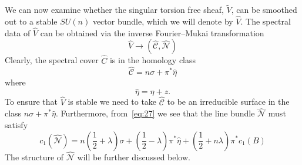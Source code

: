 \documentclass[a4paper,12pt]{article}
\numberwithin{equation}{section}
\def\cC{{\mathcal C}}
\def\cN{{\mathcal N}}
\theoremstyle{plain}
\begin{document}
We can now examine whether the singular torsion free sheaf, $\widetilde{V}$, 
can be smoothed out to a stable $SU(n)$ vector bundle, 
which we will denote by $\widehat{V}$. The spectral data of  
$\widehat{V}$ can be
obtained via the inverse Fourier--Mukai transformation
\begin{equation}
\widehat{V} \longrightarrow (\widehat{\cC}, \widehat{\cN})
\label{eq:76}
\end{equation}
Clearly, the spectral cover $\widehat{C}$ is in the homology class
\begin{equation}
\widehat{\cC} = n\sigma +\pi^{*}\hat{\eta}
\label{eq:77}
\end{equation}
where
\begin{equation}
\hat{\eta}=\eta +z.
\label{eq:78}
\end{equation}
To ensure that $\widehat{V}$ is stable we need to take $\widehat{\cC}$
to be an irreducible surface in the class $n\sigma +
\pi^{*}\hat{\eta}$. 
Furthermore, from~\eqref{eq:27} we see that the line bundle
$\widehat{\cN}$ must satisfy 
\begin{equation}
c_{1}(\widehat{\cN})=n(\frac{1}{2}+\lambda)\sigma+(\frac{1}{2}-\lambda)
\pi^{*}\hat{\eta}+(\frac{1}{2}+n\lambda)\pi^{*}c_{1}(B)
\label{eq:79}
\end{equation}
The structure of $\widehat{\cN}$ will be further discussed below.
\end{document}
